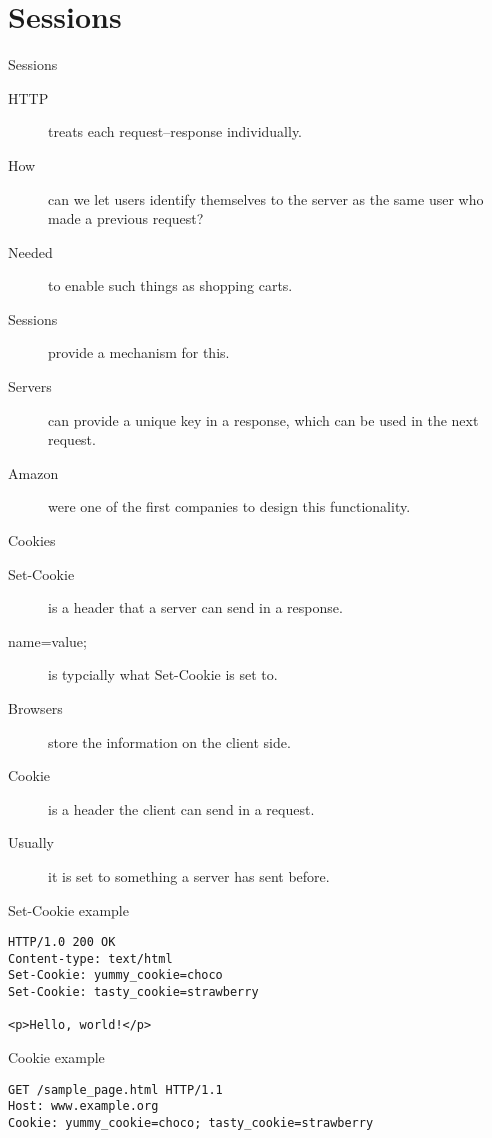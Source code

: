 \documentclass{beamer}
\begin{document}
\section{Sessions}

\begin{frame}{Sessions}
  \begin{description}
    \item[HTTP] treats each request--response individually.
		\item[How] can we let users identify themselves to the server as the same user who made a previous request?
		\item[Needed] to enable such things as shopping carts.
		\item[Sessions] provide a mechanism for this.
		\item[Servers] can provide a unique key in a response, which can be used in the next request.
		\item[Amazon] were one of the first companies to design this functionality.
  \end{description}
\end{frame}


\begin{frame}{Cookies}
  \begin{description}
    \item[Set-Cookie] is a header that a server can send in a response.
		\item[name=value;] is typcially what Set-Cookie is set to.
		\item[Browsers] store the information on the client side.
		\item[Cookie] is a header the client can send in a request.
		\item[Usually] it is set to something a server has sent before.
  \end{description}
\end{frame}


\begin{frame}[fragile]{Set-Cookie example}
  \begin{verbatim}
HTTP/1.0 200 OK
Content-type: text/html
Set-Cookie: yummy_cookie=choco
Set-Cookie: tasty_cookie=strawberry

<p>Hello, world!</p>
  \end{verbatim}
\end{frame}


\begin{frame}[fragile]{Cookie example}
  \begin{verbatim}
GET /sample_page.html HTTP/1.1
Host: www.example.org
Cookie: yummy_cookie=choco; tasty_cookie=strawberry
  \end{verbatim}
\end{frame}
\end{document}

